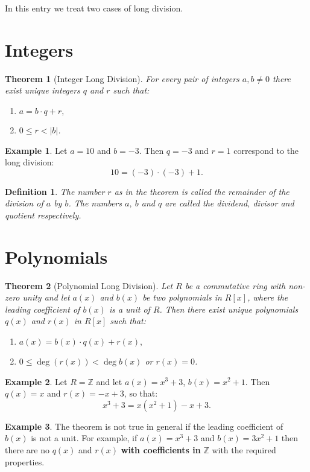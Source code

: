 \documentclass[12pt]{article}
\newtheorem{thm}{Theorem}
\newtheorem{defn}{Definition}
\theoremstyle{definition}
\newtheorem{exa}{Example}
\newcommand{\Ints}{\mathbb{Z}}
\begin{document}
In this entry we treat two cases of long division.

\section{Integers}
\begin{thm}[Integer Long Division]
For every pair of integers $a, b\neq 0$ there exist unique integers $q$ and $r$ such that:
\begin{enumerate}
\item $a=b\cdot q + r,$
\item $0\leq r < |b|$. 
\end{enumerate}
\end{thm}

\begin{exa}
Let $a=10$ and $b=-3$. Then $q=-3$ and $r=1$ correspond to the long division:
$$10=(-3)\cdot(-3)+1.$$
\end{exa}

\begin{defn}
The number $r$ as in the theorem is called the remainder of the division of $a$ by $b$. The numbers $a,\ b$ and $q$ are called the dividend, divisor and quotient respectively. 
\end{defn}

\section{Polynomials}

\begin{thm}[Polynomial Long Division]
Let $R$ be a commutative ring with non-zero unity and let $a(x)$ and $b(x)$ be two polynomials in $R[x]$, where the leading coefficient of $b(x)$ is a unit of $R$. Then there exist unique polynomials $q(x)$ and $r(x)$ in $R[x]$ such that:
\begin{enumerate}
\item $a(x)=b(x)\cdot q(x) + r(x),$
\item $0\leq \deg(r(x)) < \deg b(x)$ or $r(x)=0$. 
\end{enumerate}
\end{thm}

\begin{exa}
Let $R=\Ints$ and let $a(x)=x^3+3$, $b(x)=x^2+1$. Then $q(x)=x$ and $r(x)=-x+3$, so that:
$$x^3+3=x(x^2+1)-x+3.$$
\end{exa}

\begin{exa}
The theorem is not true in general if the leading coefficient of $b(x)$ is not a unit. For example, if $a(x)=x^3+3$ and $b(x)=3x^2+1$ then there are no $q(x)$ and $r(x)$ {\bf with coefficients in} $\Ints$ with the required properties.
\end{exa}
\end{document}

